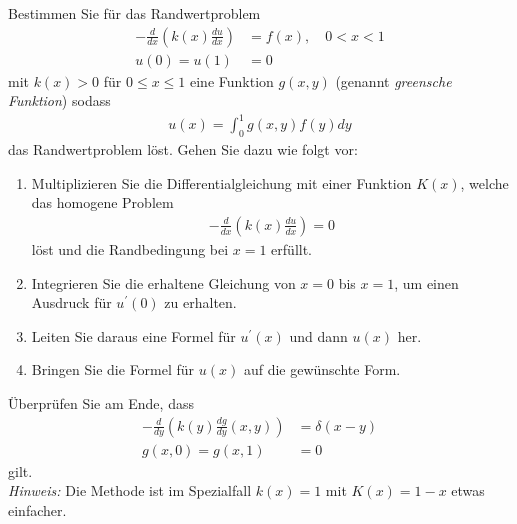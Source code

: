 
\begin{exercise}

Bestimmen Sie für das Randwertproblem
\begin{align*}
  -\frac{d}{dx}\left(k(x)\frac{du}{dx}\right) &= f(x), \quad 0 < x < 1 \\
  u(0) = u(1) &= 0
\end{align*}
mit $k(x) > 0$ für $0 \leq x \leq 1$ eine Funktion $g(x,y)$ (genannt
\textit{greensche Funktion}) sodass
\begin{align*}
  u(x) = \int_0^1g(x,y)f(y)dy
\end{align*}
das Randwertproblem löst. Gehen Sie dazu wie folgt vor:
\begin{enumerate}[label = (\roman*)]
  \item Multiplizieren Sie die Differentialgleichung mit einer Funktion $K(x)$,
  welche das homogene Problem
  \begin{align*}
    -\frac{d}{dx}\left(k(x)\frac{du}{dx}\right) = 0
  \end{align*}
  löst und die Randbedingung bei $x = 1$ erfüllt.
  \item Integrieren Sie die erhaltene Gleichung von $x = 0$ bis $x = 1$, um einen
  Ausdruck für $u^{\prime}(0)$ zu erhalten.
  \item Leiten Sie daraus eine Formel für $u^{\prime}(x)$ und dann $u(x)$ her.
  \item Bringen Sie die Formel für $u(x)$ auf die gewünschte Form.
\end{enumerate}
Überprüfen Sie am Ende, dass
\begin{align*}
  -\frac{d}{dy}\left(k(y)\frac{dg}{dy}(x,y)\right) &= \delta(x-y) \\
  g(x,0) = g(x,1) &= 0
\end{align*}
gilt. \\
\textit{Hinweis:} Die Methode ist im Spezialfall $k(x) = 1$ mit $K(x) = 1 - x$ etwas einfacher.
\end{exercise}


\begin{solution}

\phantom{}

\end{solution}

